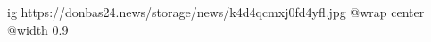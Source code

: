  
 
 
 
 

\ifcmt
  ig https://donbas24.news/storage/news/k4d4qcmxj0fd4yfl.jpg
  @wrap center
  @width 0.9
\fi
